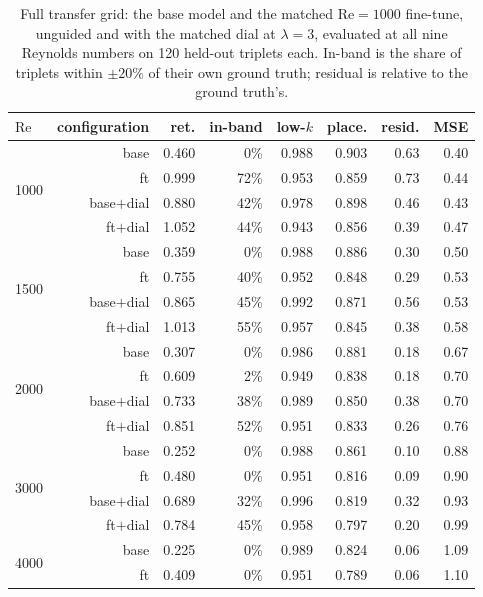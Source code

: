 \begin{table}[t]
  \centering
  \caption{Full transfer grid: the base model and the matched $\mathrm{Re}=1000$ fine-tune, unguided and with the matched dial at $\lambda=3$, evaluated at all nine Reynolds numbers on 120 held-out triplets each. In-band is the share of triplets within $\pm20\%$ of their own ground truth; residual is relative to the ground truth's.}
  \label{tab:transfer-full}
  \begin{tabular}{lrrrrrrr}
    \toprule
    $\mathrm{Re}$ & configuration & ret. & in-band & low-$k$ & place. & resid. & MSE \\
    \midrule
    \multirow{4}{*}{1000} & base & 0.460 & 0\% & 0.988 & 0.903 & 0.63 & 0.40 \\
     & ft & 0.999 & 72\% & 0.953 & 0.859 & 0.73 & 0.44 \\
     & base$+$dial & 0.880 & 42\% & 0.978 & 0.898 & 0.46 & 0.43 \\
     & ft$+$dial & 1.052 & 44\% & 0.943 & 0.856 & 0.39 & 0.47 \\
    \midrule
    \multirow{4}{*}{1500} & base & 0.359 & 0\% & 0.988 & 0.886 & 0.30 & 0.50 \\
     & ft & 0.755 & 40\% & 0.952 & 0.848 & 0.29 & 0.53 \\
     & base$+$dial & 0.865 & 45\% & 0.992 & 0.871 & 0.56 & 0.53 \\
     & ft$+$dial & 1.013 & 55\% & 0.957 & 0.845 & 0.38 & 0.58 \\
    \midrule
    \multirow{4}{*}{2000} & base & 0.307 & 0\% & 0.986 & 0.881 & 0.18 & 0.67 \\
     & ft & 0.609 & 2\% & 0.949 & 0.838 & 0.18 & 0.70 \\
     & base$+$dial & 0.733 & 38\% & 0.989 & 0.850 & 0.38 & 0.70 \\
     & ft$+$dial & 0.851 & 52\% & 0.951 & 0.833 & 0.26 & 0.76 \\
    \midrule
    \multirow{4}{*}{3000} & base & 0.252 & 0\% & 0.988 & 0.861 & 0.10 & 0.88 \\
     & ft & 0.480 & 0\% & 0.951 & 0.816 & 0.09 & 0.90 \\
     & base$+$dial & 0.689 & 32\% & 0.996 & 0.819 & 0.32 & 0.93 \\
     & ft$+$dial & 0.784 & 45\% & 0.958 & 0.797 & 0.20 & 0.99 \\
    \midrule
    \multirow{4}{*}{4000} & base & 0.225 & 0\% & 0.989 & 0.824 & 0.06 & 1.09 \\
     & ft & 0.409 & 0\% & 0.951 & 0.789 & 0.06 & 1.10 \\

\end{tabular}
\end{table}
